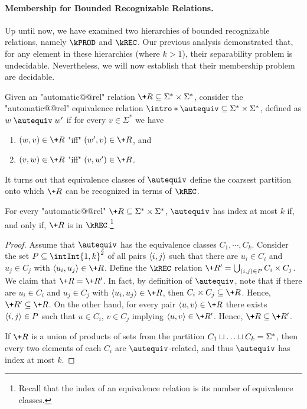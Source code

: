 \paragraph*{Membership for Bounded Recognizable Relations.}
Up until now, we have examined two hierarchies of bounded recognizable relations, namely $\kPROD$ and $\kREC$. 
Our previous analysis demonstrated that, for any element in these hierarchies (where $k>1$), their separability problem is undecidable. Nevertheless, 
we will now establish that their membership problem are decidable.

\AP Given an "automatic@@rel" relation $\+R \subseteq \Sigma^* \times \Sigma^*$, consider the "automatic@@rel" equivalence relation $\intro*\autequiv \subseteq \Sigma^* \times \Sigma^*$, defined as $w \mathrel{\autequiv} w'$ if for every $v \in \Sigma^*$ we have 
\begin{enumerate}
    \item $(w,v) \in \+R$ "iff" $(w',v) \in \+R$, and
    \item $(v,w) \in \+R$ "iff" $(v,w') \in \+R$.
\end{enumerate}

It turns out that equivalence classes of $\autequiv$ define the coarsest partition onto which $\+R$ can be recognized in terms of $\kREC$.

\begin{lemma}\AP\label{lem:krec-characterization}
    For every "automatic@@rel" $\+R \subseteq \Sigma^* \times \Sigma^*$, $\autequiv$ has index at most $k$ if, and only if, $\+R$ is in $\kREC$.\footnote{Recall that the index of an equivalence relation is its number of equivalence classes.}
\end{lemma}
\begin{proof}
    Assume that $\autequiv$ has the equivalence classes $C_1, \cdots, C_k$. Consider the set $P \subseteq \intInt{1,k}^2$ of all pairs $\langle i,j\rangle$ such that there are $u_i \in C_i$ and $u_j \in C_j$ with $\tup{u_i,u_j} \in \+R$. Define the $\kREC$ relation $\+R' = \bigcup_{(i,j) \in P} C_i \times C_j$. We claim that $\+R=\+R'$. 
    In fact, by definition of $\autequiv$, note that if there are $u_i \in C_i$ and $u_j \in C_j$ with $\tup{u_i,u_j} \in \+R$, then $C_i \times C_j \subseteq \+R$. Hence, $\+R' \subseteq \+R$.
    On the other hand, for every pair $\tup{u,v} \in \+R$ there exists $\langle i,j\rangle \in P$ such that $u \in C_i$, $v \in C_j$ implying $\tup{u,v} \in \+R'$.
    Hence, $\+R \subseteq \+R'$.

    If $\+R$ is a union of products of sets from the partition $C_1 \sqcup \dotsc \sqcup C_k = \Sigma^*$, then every two elements of each $C_i$ are $\autequiv$-related, and thus $\autequiv$ has index at most $k$.
\end{proof}

